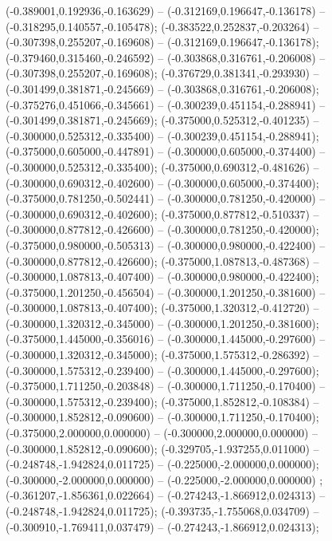  (-0.389001,0.192936,-0.163629) -- (-0.312169,0.196647,-0.136178) -- (-0.318295,0.140557,-0.105478);
 (-0.383522,0.252837,-0.203264) -- (-0.307398,0.255207,-0.169608) -- (-0.312169,0.196647,-0.136178);
 (-0.379460,0.315460,-0.246592) -- (-0.303868,0.316761,-0.206008) -- (-0.307398,0.255207,-0.169608);
 (-0.376729,0.381341,-0.293930) -- (-0.301499,0.381871,-0.245669) -- (-0.303868,0.316761,-0.206008);
 (-0.375276,0.451066,-0.345661) -- (-0.300239,0.451154,-0.288941) -- (-0.301499,0.381871,-0.245669);
 (-0.375000,0.525312,-0.401235) -- (-0.300000,0.525312,-0.335400) -- (-0.300239,0.451154,-0.288941);
 (-0.375000,0.605000,-0.447891) -- (-0.300000,0.605000,-0.374400) -- (-0.300000,0.525312,-0.335400);
 (-0.375000,0.690312,-0.481626) -- (-0.300000,0.690312,-0.402600) -- (-0.300000,0.605000,-0.374400);
 (-0.375000,0.781250,-0.502441) -- (-0.300000,0.781250,-0.420000) -- (-0.300000,0.690312,-0.402600);
 (-0.375000,0.877812,-0.510337) -- (-0.300000,0.877812,-0.426600) -- (-0.300000,0.781250,-0.420000);
 (-0.375000,0.980000,-0.505313) -- (-0.300000,0.980000,-0.422400) -- (-0.300000,0.877812,-0.426600);
 (-0.375000,1.087813,-0.487368) -- (-0.300000,1.087813,-0.407400) -- (-0.300000,0.980000,-0.422400);
 (-0.375000,1.201250,-0.456504) -- (-0.300000,1.201250,-0.381600) -- (-0.300000,1.087813,-0.407400);
 (-0.375000,1.320312,-0.412720) -- (-0.300000,1.320312,-0.345000) -- (-0.300000,1.201250,-0.381600);
 (-0.375000,1.445000,-0.356016) -- (-0.300000,1.445000,-0.297600) -- (-0.300000,1.320312,-0.345000);
 (-0.375000,1.575312,-0.286392) -- (-0.300000,1.575312,-0.239400) -- (-0.300000,1.445000,-0.297600);
 (-0.375000,1.711250,-0.203848) -- (-0.300000,1.711250,-0.170400) -- (-0.300000,1.575312,-0.239400);
 (-0.375000,1.852812,-0.108384) -- (-0.300000,1.852812,-0.090600) -- (-0.300000,1.711250,-0.170400);
 (-0.375000,2.000000,0.000000) -- (-0.300000,2.000000,0.000000) -- (-0.300000,1.852812,-0.090600);
 (-0.329705,-1.937255,0.011000) -- (-0.248748,-1.942824,0.011725) -- (-0.225000,-2.000000,0.000000);
 (-0.300000,-2.000000,0.000000) -- (-0.225000,-2.000000,0.000000) ;
 (-0.361207,-1.856361,0.022664) -- (-0.274243,-1.866912,0.024313) -- (-0.248748,-1.942824,0.011725);
 (-0.393735,-1.755068,0.034709) -- (-0.300910,-1.769411,0.037479) -- (-0.274243,-1.866912,0.024313);
